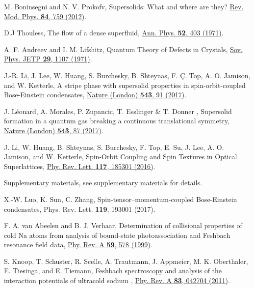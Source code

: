 \documentclass[twocolumn,prl,floatfix,citeautoscript,nofootinbib]{revtex4}
\begin{document}
\begin{thebibliography}{99}

 M. Boninsegni and N. V. Prokofv, {Supersolids: What
and where are they?} \href{https://doi.org/10.1103/RevModPhys.84.759}{Rev.
Mod. Phys. \textbf{84}, 759 (2012)}.

 D.J Thouless, {The flow of a dense superfluid}, \href{https://doi.org/10.1016/0003-4916(69)90286-3}%
{Ann. Phys. \textbf{52}, 403 (1971)}.

 A. F. Andreev and I. M. Lifshitz, {Quantum Theory of
Defects in Crystals}, \href{https://doi.org/10.1070/PU1971v013n05ABEH004235}{%
Sov. Phys. JETP \textbf{29}, 1107 (1971)}.

 J.-R. Li, J. Lee, W. Huang, S. Burchesky, B. Shteynas, F.
\c{C}. Top, A. O. Jamison, and W. Ketterle, {A stripe phase with supersolid
properties in spin-orbit-coupled Bose-Einstein condensates}, \href{https://doi.org/doi:10.1038/nature21431}%
{Nature (London) \textbf{543}, 91 (2017)}.

 J. L\'{e}onard, A. Morales, P. Zupancic, T. Esslinger
\& T. Donner , {Supersolid formation in a quantum gas breaking a continuous
translational symmetry}, \href{https://doi.org/doi:10.1038/nature21067}{%
Nature (London) \textbf{543}, 87 (2017)}.


 J. Li, W. Huang, B. Shteynas, S. Burchesky, F. Top, E. Su,
J. Lee, A. O. Jamison, and W. Ketterle, {Spin-Orbit Coupling and Spin
Textures in Optical Superlattices}, \href{https://doi.org/10.1103/PhysRevLett.117.185301}%
{Phy. Rev. Lett. \textbf{117}, 185301 (2016)}.


 Supplementary materials, see supplementary materials for
details.

 X.-W. Luo, K. Sun, C. Zhang, Spin-tensor--momentum-coupled
Bose-Einstein condensates, Phys. Rev. Lett. \textbf{119}, 193001 (2017).


 F. A. van Abeelen and B. J. Verhaar, {Determination of
collisional properties of cold Na atoms from analysis of bound-state
photoassociation and Feshbach resonance field data}, \href{https://doi.org/10.1103/PhysRevA.59.578}%
{Phy. Rev. A \textbf{59}, 578 (1999)}.

 S. Knoop, T. Schuster, R. Scelle, A. Trautmann, J.
Appmeier, M. K. Oberthaler, E. Tiesinga, and E. Tiemann, {Feshbach
spectroscopy and analysis of the interaction potentials of ultracold sodium}%
, \href{https://doi.org/10.1103/PhysRevA.83.042704}{Phy. Rev. A \textbf{83},
042704 (2011)}.


\end{thebibliography}
\end{document}

